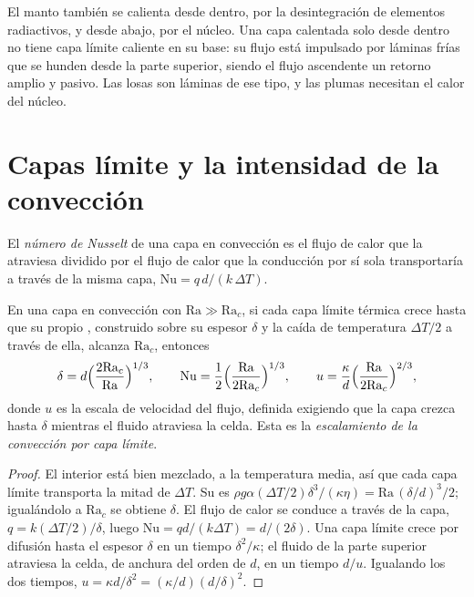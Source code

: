 El manto también se calienta desde dentro, por la desintegración de elementos radiactivos,
y desde abajo, por el núcleo. Una capa calentada solo desde dentro no tiene
capa límite caliente en su base: su flujo está impulsado por láminas frías que se hunden desde la
parte superior, siendo el flujo ascendente un retorno amplio y pasivo. Las losas son láminas de ese tipo, y
las plumas necesitan el calor del núcleo.

\section{Capas límite y la intensidad de la convección}

\begin{definition}\label{def:b3:mantle-convection:nusselt}
El \emph{número de Nusselt} de una capa en convección es el
flujo de calor que la atraviesa dividido por el flujo de calor que la conducción por sí sola transportaría
a través de la misma capa, $\mathrm{Nu} = q\,d/(k\,\Delta T)$.
\end{definition}

\begin{theorem}\label{thm:b3:mantle-convection:scaling}
En una capa en convección con $\mathrm{Ra} \gg \mathrm{Ra}_c$, si cada capa límite térmica
crece hasta que su propio , construido sobre su espesor
$\delta$ y la caída de temperatura $\Delta T/2$ a través de ella, alcanza
$\mathrm{Ra}_c$, entonces
\[
  \delta = d\Bigl(\frac{2\mathrm{Ra}_c}{\mathrm{Ra}}\Bigr)^{1/3},\qquad
  \mathrm{Nu} = \frac12\Bigl(\frac{\mathrm{Ra}}{2\mathrm{Ra}_c}\Bigr)^{1/3},
  \qquad
  u = \frac\kappa d\Bigl(\frac{\mathrm{Ra}}{2\mathrm{Ra}_c}\Bigr)^{2/3},
\]
donde $u$ es la escala de velocidad del flujo, definida exigiendo que la
capa crezca hasta $\delta$ mientras el fluido atraviesa la celda. Esta es la
\emph{escalamiento de la convección por capa límite}.
\end{theorem}

\begin{proof}
El interior está bien mezclado, a la temperatura media, así que cada capa límite
transporta la mitad de $\Delta T$. Su  es $\rho g\alpha(\Delta T/2)
\delta^3/(\kappa\eta) = \mathrm{Ra}\,(\delta/d)^3/2$; igualándolo a
$\mathrm{Ra}_c$ se obtiene $\delta$. El flujo de calor se conduce a través de la capa,
$q = k(\Delta T/2)/\delta$, luego $\mathrm{Nu} = qd/(k\Delta T) = d/(2\delta)$.
Una capa límite crece por difusión hasta el espesor $\delta$ en un tiempo
$\delta^2/\kappa$; el fluido de la parte superior atraviesa la celda, de anchura del orden de
$d$, en un tiempo $d/u$. Igualando los dos tiempos, $u = \kappa d/\delta^2 =
(\kappa/d)(d/\delta)^2$.
\end{proof}

